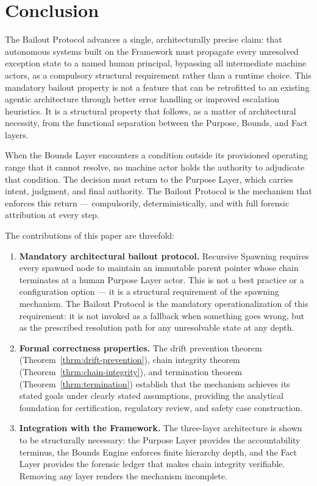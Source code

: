 \section{Conclusion}
\label{sec:conclusion}

The Bailout Protocol advances a single, architecturally precise claim: that autonomous systems built on the \bxthree{} Framework must propagate every unresolved exception state to a named human principal, bypassing all intermediate machine actors, as a compulsory structural requirement rather than a runtime choice. This mandatory bailout property is not a feature that can be retrofitted to an existing agentic architecture through better error handling or improved escalation heuristics. It is a structural property that follows, as a matter of architectural necessity, from the functional separation between the Purpose, Bounds, and Fact layers.

When the Bounds Layer encounters a condition outside its provisioned operating range that it cannot resolve, no machine actor holds the authority to adjudicate that condition. The decision must return to the Purpose Layer, which carries intent, judgment, and final authority. The Bailout Protocol is the mechanism that enforces this return --- compulsorily, deterministically, and with full forensic attribution at every step.

The contributions of this paper are threefold:

\begin{enumerate}
    \itemsep0em
    \item \textbf{Mandatory architectural bailout protocol.} Recursive Spawning requires every spawned node to maintain an immutable parent pointer whose chain terminates at a human Purpose Layer actor. This is not a best practice or a configuration option --- it is a structural requirement of the spawning mechanism. The Bailout Protocol is the mandatory operationalization of this requirement: it is not invoked as a fallback when something goes wrong, but as the prescribed resolution path for any unresolvable state at any depth.

    \item \textbf{Formal correctness properties.} The drift prevention theorem (Theorem~\ref{thrm:drift-prevention}), chain integrity theorem (Theorem~\ref{thrm:chain-integrity}), and termination theorem (Theorem~\ref{thrm:termination}) establish that the mechanism achieves its stated goals under clearly stated assumptions, providing the analytical foundation for certification, regulatory review, and safety case construction.

    \item \textbf{Integration with the \bxthree{} Framework.} The three-layer architecture is shown to be structurally necessary: the Purpose Layer provides the accountability terminus, the Bounds Engine enforces finite hierarchy depth, and the Fact Layer provides the forensic ledger that makes chain integrity verifiable. Removing any layer renders the mechanism incomplete.
\end{enumerate}

